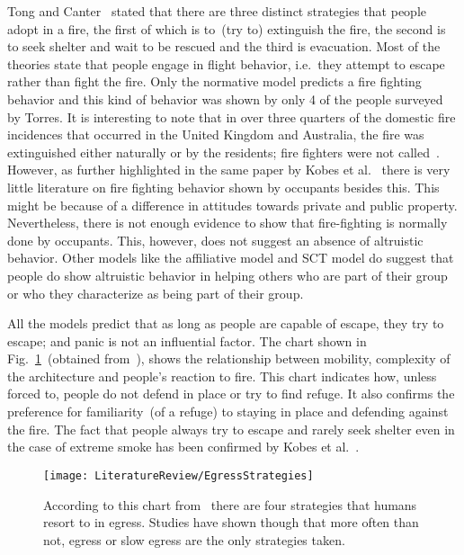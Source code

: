 Tong and Canter~\cite{Tong:1985wn} stated that there are three distinct strategies that people adopt in a fire, the first of which is to~(try to) extinguish the fire, the second is to seek shelter and wait to be rescued and the third is evacuation. Most of the theories state that people engage in flight behavior, i.e.\ they attempt to escape rather than fight the fire. Only the normative model predicts a fire fighting behavior and this kind of behavior was shown by only 4 of the people surveyed by Torres. It is interesting to note that in over three quarters of the domestic fire incidences that occurred in the United Kingdom and Australia, the fire was extinguished either naturally or by the residents; fire fighters were not called~\cite{Kobes:2009jx}. However, as further highlighted in the same paper by Kobes et al.~\cite{Kobes:2009jx} there is very little literature on fire fighting behavior shown by occupants besides this. This might be because of a difference in attitudes towards private and public property. Nevertheless, there is not enough evidence to show that fire-fighting is normally done by occupants. This, however, does not suggest an absence of altruistic behavior. Other models like the affiliative model and SCT model do suggest that people do show altruistic behavior in helping others who are part of their group or who they characterize as being part of their group.

All the models predict that as long as people are capable of escape, they try to escape; and panic is not an influential factor. The chart shown in Fig.~\ref{fig:EgressAge}~(obtained from~\cite{Klupfel:2005to}), shows the relationship between mobility, complexity of the architecture and people's reaction to fire. This chart indicates how, unless forced to, people do not defend in place or try to find refuge. It also confirms the preference for familiarity~(of a refuge) to staying in place and defending against the fire. The fact that people always try to escape and rarely seek shelter even in the case of extreme smoke has been confirmed by Kobes et al.~\cite{Kobes:2009jx}.

\begin{figure}[!t]
\centering
\texttt{[image: LiteratureReview/EgressStrategies]}
\caption[Strategies for Egress]{According to this chart from~\cite{Klupfel:2005to} there are four strategies that humans resort to in egress. Studies have shown though that more often than not, egress or slow egress are the only strategies taken.}
\label{fig:EgressAge}
\end{figure}

